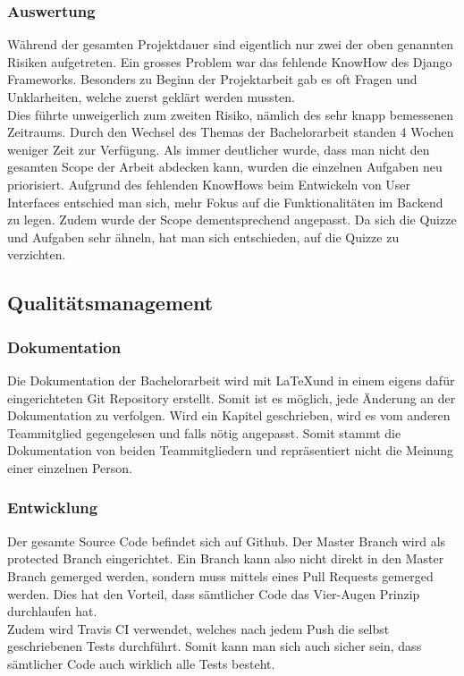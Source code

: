 \subsubsection*{Auswertung}
Während der gesamten Projektdauer sind eigentlich nur zwei der oben genannten Risiken aufgetreten. Ein grosses Problem war das fehlende KnowHow des Django Frameworks. Besonders zu Beginn der Projektarbeit gab es oft Fragen und Unklarheiten, welche zuerst geklärt werden mussten. \\
Dies führte unweigerlich zum zweiten Risiko, nämlich des sehr knapp bemessenen Zeitraums. Durch den Wechsel des Themas der Bachelorarbeit standen 4 Wochen weniger Zeit zur Verfügung. Als immer deutlicher wurde, dass man nicht den gesamten Scope der Arbeit abdecken kann, wurden die einzelnen Aufgaben neu priorisiert. Aufgrund des fehlenden KnowHows beim Entwickeln von User Interfaces entschied man sich, mehr Fokus auf die Funktionalitäten im Backend zu legen. Zudem wurde der Scope dementsprechend angepasst. Da sich die Quizze und Aufgaben sehr ähneln, hat man sich entschieden, auf die Quizze zu verzichten.

\subsection{Qualitätsmanagement}

\subsubsection*{Dokumentation}
Die Dokumentation der Bachelorarbeit wird mit \LaTeX und in einem eigens dafür eingerichteten Git Repository erstellt. Somit ist es möglich, jede Änderung an der Dokumentation zu verfolgen. Wird ein Kapitel geschrieben, wird es vom anderen Teammitglied gegengelesen und falls nötig angepasst. Somit stammt die Dokumentation von beiden Teammitgliedern und repräsentiert nicht die Meinung einer einzelnen Person. 


\subsubsection*{Entwicklung}
Der gesamte Source Code befindet sich auf Github. Der Master Branch wird als protected Branch eingerichtet. Ein Branch kann also nicht direkt in den Master Branch gemerged werden, sondern muss mittels eines Pull Requests gemerged werden. Dies hat den Vorteil, dass sämtlicher Code das Vier-Augen Prinzip durchlaufen hat. \\ 
Zudem wird Travis CI verwendet, welches nach jedem Push die selbst geschriebenen Tests durchführt. Somit kann man sich auch sicher sein, dass sämtlicher Code auch wirklich alle Tests besteht.

